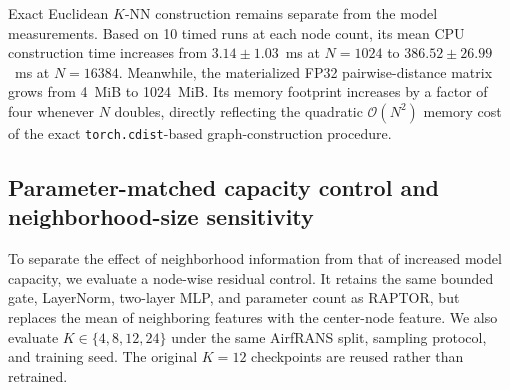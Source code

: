 \documentclass[a4paper,fleqn]{cas-sc}
\begin{document}
Exact Euclidean \(K\)-NN construction remains separate from the model
measurements. Based on 10 timed runs at each node count, its mean CPU
construction time increases from \(3.14\pm1.03\)~ms at \(N=1024\) to
\(386.52\pm26.99\)~ms at \(N=16384\). Meanwhile, the materialized FP32
pairwise-distance matrix grows from 4~MiB to 1024~MiB. Its memory
footprint increases by a factor of four whenever \(N\) doubles,
directly reflecting the quadratic \(\mathcal{O}(N^2)\) memory cost of
the exact \texttt{torch.cdist}-based graph-construction procedure.

\subsection{Parameter-matched capacity control and neighborhood-size sensitivity}
\label{subsec:capacity_knn}

To separate the effect of neighborhood information from that of increased
model capacity, we evaluate a node-wise residual control. It retains the
same bounded gate, LayerNorm, two-layer MLP, and parameter count as RAPTOR,
but replaces the mean of neighboring features with the center-node feature.
We also evaluate $K\in\{4,8,12,24\}$ under the same AirfRANS split,
sampling protocol, and training seed. The original $K=12$ checkpoints are
reused rather than retrained.
\end{document}
